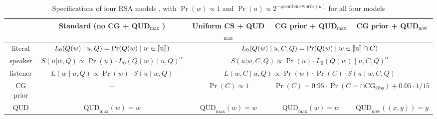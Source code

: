 \begin{table}
\centering
\begin{tabular}{c|c|c|c|c}
         & Standard (no CG + QUD$_\text{max}$ ) & Uniform CS + QUD$_\text{max}$ & CG prior + QUD$_\text{max}$ & CG prior + QUD$_\text{now}$ \\ \hline 
literal  & $L_0(Q(w) \mid u, Q) = \Pr(Q(w) \mid w \in \llbracket \text{u} \rrbracket)$ & 
\multicolumn{3}{c}{$L_0(Q(w) \mid u, C, Q) = \Pr(Q(w) \mid w \in \llbracket \text{u} \rrbracket \cap C)$} \\
speaker  & $S(u | w, Q) \propto \Pr(u) \cdot L_0(Q(w) \mid u, Q)^\alpha $ & \multicolumn{3}{c}{$S(u | w, C, Q) \propto \Pr(u) \cdot L_0(Q(w) \mid u, C, Q)^\alpha$} \\
listener & $L(w \mid u, Q) \propto \Pr(w) \cdot S(u \mid w, Q)$ & \multicolumn{3}{c}{$L(w, C \mid u, Q) \propto \Pr(w) \cdot \Pr(C) \cdot S(u \mid w, C, Q)$} \\
CG prior & -- & $\Pr(C) \propto 1$ & \multicolumn{2}{c}{$\Pr(C)=0.95\cdot\Pr(C=\cap\text{CG}_\text{Obs})+0.05\cdot 1/15$} \\
QUD      & $\text{QUD}_\text{max}(w)=w$ & $\text{QUD}_\text{max}(w)=w$ & $\text{QUD}_\text{max}(w)=w$ & $\text{QUD}_\text{now}((x,y))=y$\\
\hline
\end{tabular}
\caption{Specifications of four RSA models \label{tab:models}, with $\Pr(w)\propto1$ and $\Pr(u) \propto 2^{-\#\textrm{content-words}(u)}$ for all four models}
\end{table} 
 
